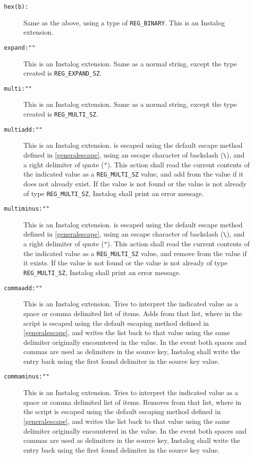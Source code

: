 \begin{description}
\begin{enumerate}
\end{enumerate}
\item[\texttt{hex(b):\var{HexDigits}}] Same as the above, using a type of
\verb|REG_BINARY|. This is an Instalog extension.
\item[\texttt{expand:"\var{String}"}] This is an Instalog extension. Same as a
normal string, except the type created is \verb|REG_EXPAND_SZ|.
\item[\texttt{multi:"\var{String}"}] This is an Instalog extension. Same as a
normal string, except the type created is \verb|REG_MULTI_SZ|.
\item[\texttt{multiadd:"\var{String}"}] This is an Instalog extension.
 is escaped using the default escape method defined in \ref{generalescape}, using an
escape character of backslash (\verb|\|), and a right delimiter of quote
(\verb|"|). This action shall read the current contents of the indicated value
as a \verb|REG_MULTI_SZ| value, and add  from the value if it does
not already exist. If the value is not found or the value is not already of
type \verb|REG_MULTI_SZ|, Instalog shall print an error message.
\item[\texttt{multiminus:"\var{String}"}] This is an Instalog extension.
 is escaped using the default escape method defined in \ref{generalescape}, using an
escape character of backslash (\verb|\|), and a right delimiter of quote
(\verb|"|). This action shall read the current contents of the indicated value
as a \verb|REG_MULTI_SZ| value, and remove  from the value if it
exists. If the value is not found or the value is not already of type
\verb|REG_MULTI_SZ|, Instalog shall print an error message.
\item[\texttt{commaadd:"\var{String}"}] This is an Instalog extension. Tries to
interpret the indicated value as a space or comma delimited list of items.
Adds  from that list, where in the script  is escaped
using the default escaping method defined in \ref{generalescape}, and writes the
list back to that value using the same delimiter originally encountered in the
value. In the event both spaces and commas are used as delimiters in the source
key, Instalog shall write the entry back using the first found delimiter in the
source key value.
\item[\texttt{commaminus:"\var{String}"}] This is an Instalog extension. Tries
to interpret the indicated value as a space or comma delimited list of items.
Removes  from that list, where in the script  is escaped
using the default escaping method defined in \ref{generalescape}, and writes the
list back to that value using the same delimiter originally encountered in the
value. In the event both spaces and commas are used as delimiters in the source
key, Instalog shall write the entry back using the first found delimiter in the
source key value.
\end{description}

